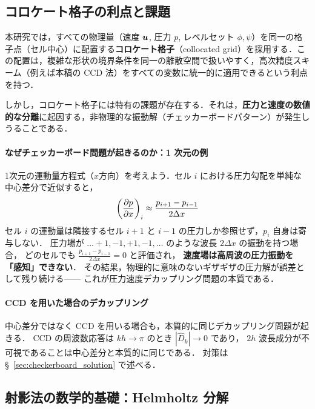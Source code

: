 \subsection{コロケート格子の利点と課題}
\label{sec:collocate_layout}
本研究では，すべての物理量（速度 $\bm{u}$, 圧力 $p$, レベルセット $\phi, \psi$）を同一の格子点（セル中心）に配置する\textbf{コロケート格子}（collocated grid）を採用する．この配置は，複雑な形状の境界条件を同一の離散空間で扱いやすく，高次精度スキーム（例えば本稿の CCD 法）をすべての変数に統一的に適用できるという利点を持つ．

しかし，コロケート格子には特有の課題が存在する．それは，\textbf{圧力と速度の数値的な分離}に起因する，非物理的な振動解（チェッカーボードパターン）が発生しうることである．

\paragraph{なぜチェッカーボード問題が起きるのか：1 次元の例}

1次元の運動量方程式（$x$方向）を考えよう．セル $i$ における圧力勾配を単純な中心差分で近似すると，
\[ \left(\dfrac{\partial p}{\partial x}\right)_i \approx \frac{p_{i+1} - p_{i-1}}{2\Delta x} \]
セル $i$ の運動量は隣接するセル $i+1$ と $i-1$ の圧力しか参照せず，$p_i$ 自身は寄与しない．
圧力場が $\ldots +1, -1, +1, -1, \ldots$ のような波長 $2\Delta x$ の振動を持つ場合，
どのセルでも $\frac{p_{i+1}-p_{i-1}}{2\Delta x} = 0$ と評価され，
\textbf{速度場は高周波の圧力振動を「感知」できない}．
その結果，物理的に意味のないギザギザの圧力解が誤差として残り続ける——
これが圧力速度デカップリング問題の本質である．

\paragraph{CCD を用いた場合のデカップリング}
中心差分ではなく CCD を用いる場合も，本質的に同じデカップリング問題が起きる．
CCD の周波数応答は $kh \to \pi$ のとき $|\hat{D}_k| \to 0$ であり，
$2h$ 波長成分が不可視であることは中心差分と本質的に同じである．
対策は §~\ref{sec:checkerboard_solution} で述べる．

\subsection{射影法の数学的基礎：Helmholtz 分解}
\label{sec:helmholtz}

